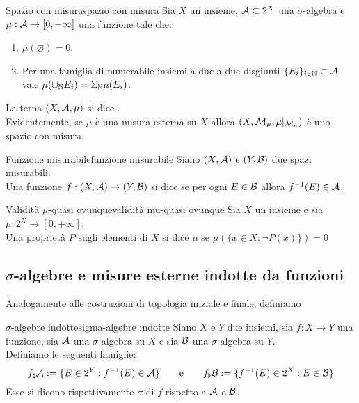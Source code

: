 \documentclass{article}
\renewcommand\A{\mc{A}}
\begin{document}
\begin{definition}{Spazio con misura}{spazio con misura}
    Sia $X$ un insieme, $\A \subset 2^X$ una $\sigma$-algebra e $\mu: \A \to [0, +\infty]$ una funzione tale che:\begin{enumerate}
        \item $\mu(\varnothing) = 0$.
        \item Per una famiglia di numerabile insiemi a due a due disgiunti $\{E_i\}_{i \in \N}\subset \A$ vale $\mu(\cup_{\mathbb{N}} E_i) = \Sigma_{\mathbb{N}} \mu(E_i)$.
    \end{enumerate}
    La terna $(X,\A,\mu)$ si dice .\\
    Evidentemente, se $\mu$ è una misura esterna su $X$ allora $(X, \mathcal{M}_\mu, \mu|_{\mathcal{M}_\mu})$ è uno spazio con misura.
\end{definition}

\begin{definition}{Funzione misurabile}{funzione misurabile}
    Siano $(X,\A)$ e $(Y,\mathcal{B})$ due spazi misurabili.\\
    Una funzione $f: (X,\A)\to (Y,\B)$ si dice  se per ogni $E \in \mathcal{B}$ allora $f^{-1}(E) \in \A$.
\end{definition}

\begin{definition}{Validità $\mu$-quasi ovunque}{validità mu-quasi ovunque}
    Sia $X$ un insieme e sia $\mu:2^X\to [0,+\infty]$.\\
    Una proprietà $P$ sugli elementi di $X$ si dice  $\mu$ se $\mu(\{x \in X : \neg P(x)\}) = 0$
\end{definition}

\subsection{$\sigma$-algebre e misure esterne indotte da funzioni}

Analogamente alle costruzioni di topologia iniziale e finale, definiamo 

\begin{definition}{$\sigma$-algebre indotte}{sigma-algebre indotte}
    Siano $X$ e $Y$ due insiemi, sia $f : X \to Y$ una funzione, sia $\A$ una $\sigma$-algebra su $X$ e sia $\mathcal{B}$ una $\sigma$-algebra su $Y$.\\
    Definiamo le seguenti famiglie:
    \[f_\sharp \A := \{E \in 2^Y : f^{-1}(E)\in \A\}\qquad \text{e}\qquad f_\flat\B := \{f^{-1}(E) \in 2^X : E \in \B \}\]
    Esse si dicono rispettivamente $\sigma$ di $f$ rispetto a $\A$ e $\mathcal{B}$.
\end{definition}
\end{document}
